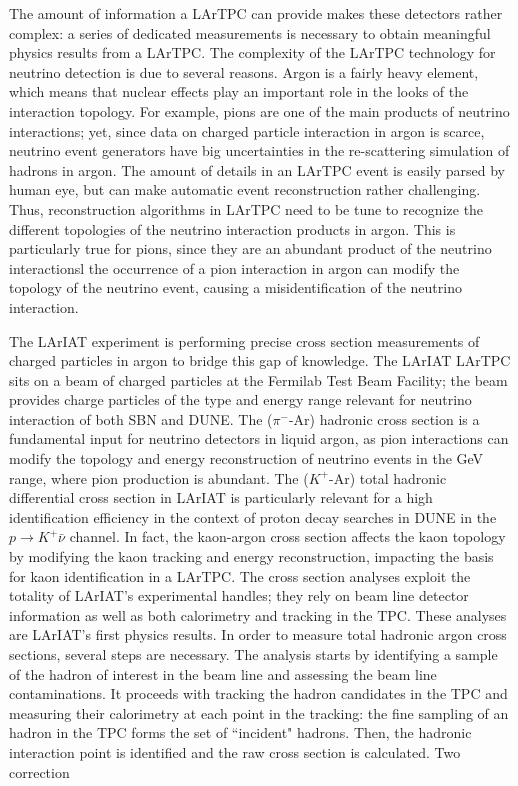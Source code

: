 The amount of information a LArTPC can provide makes these detectors rather complex: a series of dedicated measurements is necessary to obtain meaningful physics results from a LArTPC. The complexity of the LArTPC technology for neutrino detection is due to several reasons. Argon is a fairly heavy element, which means that nuclear effects play an important role in the looks of the interaction topology. For example, pions are one of the main products of neutrino interactions; yet,  since data on charged particle interaction in argon is scarce, neutrino event generators have big uncertainties in the re-scattering simulation of hadrons in argon. %
The amount of details in an LArTPC event is easily  parsed by human eye, but can make automatic event reconstruction rather challenging. Thus, reconstruction algorithms in LArTPC need to be tune to recognize the different topologies of the neutrino interaction products in argon. This is particularly true for pions, since they are an abundant product of the neutrino interactionsl the occurrence of a pion interaction in argon can modify the topology of the neutrino event, causing a misidentification of the neutrino interaction.

The LArIAT \cite{Cavanna:2014iqa} experiment is performing precise cross section measurements of charged particles in argon to bridge this gap of knowledge. 
The LArIAT LArTPC sits on a beam of charged particles at the Fermilab Test Beam Facility; the beam provides charge particles of the type and energy range relevant for neutrino interaction of both SBN and DUNE. The ($\pi^-$-Ar) hadronic cross section is a fundamental input for neutrino detectors in liquid argon, as pion interactions can modify the topology and energy reconstruction of neutrino events in the GeV range, where pion production is abundant. The  ($K^+$-Ar) total hadronic differential cross section in LArIAT is particularly relevant for a high identification efficiency in the context of proton decay searches in DUNE in the  $p\rightarrow K^+\bar{\nu}$  channel. In fact, the kaon-argon cross section affects the kaon topology by modifying the kaon tracking and energy reconstruction, impacting the basis for kaon identification in a LArTPC.  
The cross section analyses exploit the totality of LArIAT's experimental handles; they rely on beam line detector information as well as both calorimetry and tracking in the TPC. These analyses are LArIAT's first physics results. 
In order to measure total hadronic  argon cross sections, several steps are necessary. The analysis starts by identifying a sample of the hadron of interest in the beam line and assessing the beam line contaminations. It proceeds with tracking the hadron candidates in the TPC and measuring their calorimetry at each point in the tracking: the fine sampling of an hadron in the TPC forms the set of ``incident" hadrons.  Then, the hadronic interaction point is identified and the raw cross section is calculated. Two correction\\

